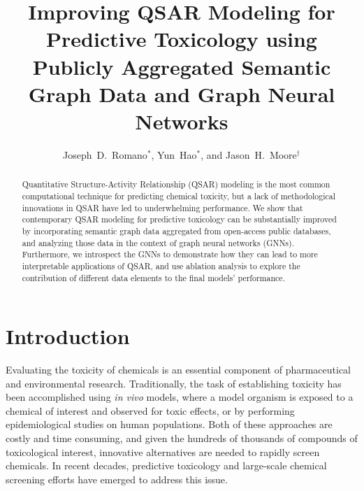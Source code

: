 \documentclass{ws-procs11x85}
\begin{document}
\title{Improving QSAR Modeling for Predictive Toxicology using Publicly Aggregated Semantic Graph Data and Graph Neural Networks}

\author{Joseph~D.~Romano$^*$, Yun~Hao$^*$, and Jason~H.~Moore$^\dag$}

\address{Institute for Biomedical Informatics, University of Pennsylvania,\\
Philadelphia, Pennsylvania 19104, United States\\
$^\dag$Corresponding author e-mail: jhmoore@upenn.edu\\
$^*$These authors contributed equally.}

\begin{abstract}
Quantitative Structure-Activity Relationship (QSAR) modeling is the most common computational technique for predicting chemical toxicity, but a lack of methodological innovations in QSAR have led to underwhelming performance.
We show that contemporary QSAR modeling for predictive toxicology can be substantially improved by incorporating semantic graph data aggregated from open-access public databases, and analyzing those data in the context of graph neural networks (GNNs).
Furthermore, we introspect the GNNs to demonstrate how they can lead to more interpretable applications of QSAR, and use ablation analysis to explore the contribution of different data elements to the final models' performance.
\end{abstract}


\section{Introduction}\label{introduction}
Evaluating the toxicity of chemicals is an essential component of pharmaceutical and environmental research.
Traditionally, the task of establishing toxicity has been accomplished using \textit{in vivo} models, where a model organism is exposed to a chemical of interest and observed for toxic effects, or by performing epidemiological studies on human populations.
Both of these approaches are costly and time consuming, and given the hundreds of thousands of compounds of toxicological interest, innovative alternatives are needed to rapidly screen chemicals.
In recent decades, predictive toxicology and large-scale chemical screening efforts have emerged to address this issue.
\end{document}
